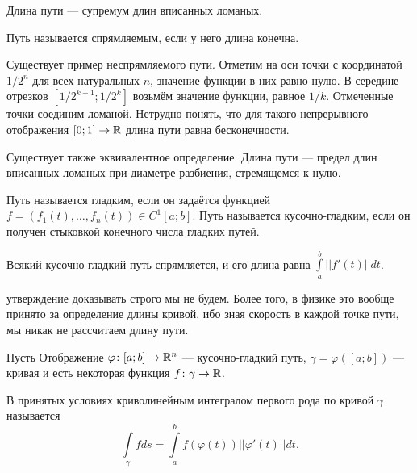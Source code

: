 \begin{Def}
    Длина пути --- супремум длин вписанных ломаных. 
\end{Def}
\begin{Def}
    Путь называется спрямляемым, если у него длина конечна.
\end{Def}
Существует пример неспрямляемого пути. Отметим на оси точки с координатой $1/2^n$ для всех натуральных $n$, значение функции в них равно нулю. В середине отрезков $[1/2^{k + 1}; 1/2^{k}]$ возьмём значение функции, равное $1/k$. Отмеченные точки соединим ломаной. Нетрудно понять, что для такого непрерывного отображения $[0;1] \to \mathbb{R}$ длина пути равна бесконечности.
\begin{center}
\end{center}
\begin{Comment}
    Существует также эквивалентное определение. Длина пути --- предел длин вписанных ломаных при диаметре разбиения, стремящемся к нулю.
\end{Comment}
\begin{Def}
    Путь называется гладким, если он задаётся функцией $f = (f_1(t), \ldots, f_n(t))\in C^1[a;b]$. Путь называется кусочно-гладким, если он получен стыковкой конечного числа гладких путей.
\end{Def}
\begin{Statement}
    Всякий кусочно-гладкий путь спрямляется, и его длина равна $\int\limits_{a}^b ||f'(t)|| dt$.
\end{Statement}
 утверждение доказывать строго мы не будем. Более того, в физике это вообще принято за определение длины кривой, ибо зная скорость в каждой точке пути, мы никак не рассчитаем длину пути.
\par Пусть Отображение $\varphi \colon [a; b] \to \mathbb{R}^n$ --- кусочно-гладкий путь, $\gamma = \varphi([a;b])$ --- кривая и есть некоторая функция $f\colon \gamma \to \mathbb{R}$.
\begin{Def}
    В принятых условиях криволинейным интегралом первого рода по кривой $\gamma$ называется
    $$
        \int\limits_\gamma fds =  \int\limits_{a}^{b} f(\varphi(t))||\varphi'(t)||dt.
    $$
\end{Def}
